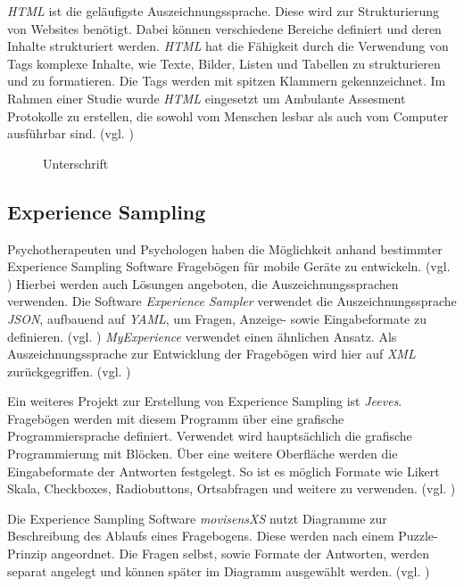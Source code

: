 \emph{HTML} ist die geläufigste Auszeichnungssprache. Diese wird zur Strukturierung von Websites benötigt. Dabei können verschiedene Bereiche definiert und deren Inhalte strukturiert werden. \emph{HTML} hat die Fähigkeit durch die Verwendung von Tags komplexe Inhalte, wie Texte, Bilder, Listen und Tabellen zu strukturieren und zu formatieren. Die Tags werden mit spitzen Klammern gekennzeichnet. Im Rahmen einer Studie wurde \emph{HTML} eingesetzt um Ambulante Assesment Protokolle zu erstellen, die sowohl vom Menschen lesbar als auch vom Computer ausführbar sind. (vgl. \cite{Batalas2018})

\begin{figure}[h]
\centering
{}
\caption{Unterschrift}
\label{methVorgehen}
\end{figure}

\subsection{Experience Sampling}
Psychotherapeuten und Psychologen haben die Möglichkeit anhand bestimmter Experience Sampling Software Fragebögen für mobile Geräte zu entwickeln. (vgl. \cite{OSFSabri6:online}) Hierbei werden auch Lösungen angeboten, die  Auszeichnungssprachen verwenden. Die Software \emph{Experience Sampler} verwendet die Auszeichnungssprache \emph{JSON}, aufbauend auf \emph{YAML}, um Fragen, Anzeige- sowie Eingabeformate zu definieren. (vgl. \cite{OSFSabri6:online}) \emph{MyExperience} verwendet einen ähnlichen Ansatz. Als Auszeichnungssprache zur Entwicklung der Fragebögen wird hier auf \emph{XML} zurückgegriffen. (vgl. \cite{theMyExp48:online})

Ein weiteres Projekt zur Erstellung von Experience Sampling ist \emph{Jeeves}. Fragebögen werden mit diesem Programm über eine grafische Programmiersprache definiert. Verwendet wird hauptsächlich die grafische Programmierung mit Blöcken. Über eine weitere Oberfläche werden die Eingabeformate der Antworten festgelegt. So ist es möglich Formate wie Likert Skala, Checkboxes, Radiobuttons, Ortsabfragen und weitere zu verwenden. (vgl. \cite{Rough2017})

Die Experience Sampling Software \emph{movisensXS} nutzt Diagramme zur Beschreibung des Ablaufs eines Fragebogens. Diese werden nach einem Puzzle-Prinzip angeordnet. Die Fragen selbst, sowie Formate der Antworten, werden separat angelegt und können später im Diagramm ausgewählt werden. (vgl. \cite{movisens59:online})

